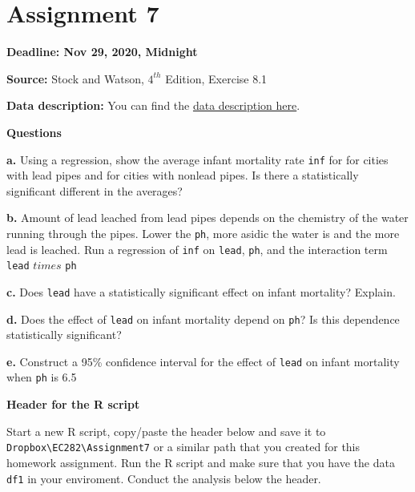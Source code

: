 \documentclass[
]{book}
\begin{document}
\hypertarget{assignment-7}{%
\section{Assignment 7}\label{assignment-7}}

\textbf{Deadline: Nov 29, 2020, Midnight}

\textbf{Source:} Stock and Watson, \(4^{th}\) Edition, Exercise 8.1

\textbf{Data description:} You can find the \href{https://www.dropbox.com/s/xdensdqj97bf2cj/Lead_Mortality_Description.pdf?dl=1}{data description here}.

\textbf{Questions}

\textbf{a.} Using a regression, show the average infant mortality rate \texttt{inf} for for cities with lead pipes and for cities with nonlead pipes. Is there a statistically significant different in the averages?

\textbf{b.} Amount of lead leached from lead pipes depends on the chemistry of the water running through the pipes. Lower the \texttt{ph}, more asidic the water is and the more lead is leached. Run a regression of \texttt{inf} on \texttt{lead}, \texttt{ph}, and the interaction term \texttt{lead} \(times\) \texttt{ph}

\textbf{c.} Does \texttt{lead} have a statistically significant effect on infant mortality? Explain.

\textbf{d.} Does the effect of \texttt{lead} on infant mortality depend on \texttt{ph}? Is this dependence statistically significant?

\textbf{e.} Construct a 95\% confidence interval for the effect of \texttt{lead} on infant mortality when \texttt{ph} is 6.5

\textbf{Header for the R script}

Start a new R script, copy/paste the header below and save it to \texttt{Dropbox\textbackslash{}EC282\textbackslash{}Assignment7} or a similar path that you created for this homework assignment. Run the R script and make sure that you have the data \texttt{df1} in your enviroment. Conduct the analysis below the header.
\end{document}
